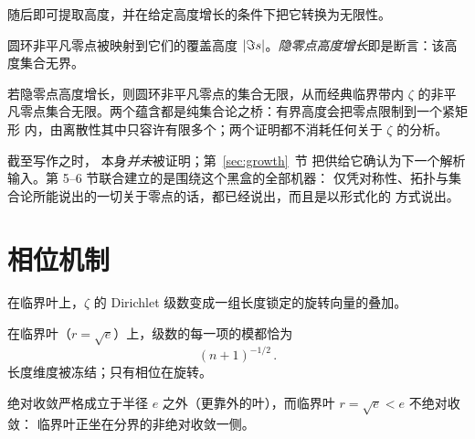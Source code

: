 随后即可提取高度，并在给定高度增长的条件下把它转换为无限性。

\begin{definition}\label{def:heightgrowth}
圆环非平凡零点被映射到它们的覆盖高度
$\lvert \Im s\rvert$。\emph{隐零点高度增长}即是断言：该高度集合无界。
\end{definition}

\begin{theorem}
\label{thm:heightgrowth}
若隐零点高度增长，则圆环非平凡零点的集合无限，从而经典临界带内 $\zeta$
的非平凡零点集合无限。两个蕴含都是纯集合论之桥：有界高度会把零点限制到一个紧矩形
内，由离散性其中只容许有限多个；两个证明都不消耗任何关于 $\zeta$ 的分析。
\end{theorem}

\begin{remark}
截至写作之时， 本身\emph{并未}被证明；第~\ref{sec:growth}~节
把供给它确认为下一个解析输入。第 5--6 节联合建立的是围绕这个黑盒的全部机器：
仅凭对称性、拓扑与集合论所能说出的一切关于零点的话，都已经说出，而且是以形式化的
方式说出。
\end{remark}

\section{相位机制}\label{sec:phase}

在临界叶上，$\zeta$ 的 Dirichlet 级数变成一组长度锁定的旋转向量的叠加。

\begin{proposition}
\label{prop:lock}
在临界叶（$r=\sqrt{e}$）上，级数的每一项的模都恰为
\[
  (n+1)^{-1/2}\, .
\]
长度维度被冻结；只有相位在旋转。
\end{proposition}

\begin{proposition}\label{prop:convdiv}
绝对收敛严格成立于半径 $e$ 之外（更靠外的叶），而临界叶 $r=\sqrt{e}<e$ 不绝对收敛：
临界叶正坐在分界的非绝对收敛一侧。
\end{proposition}

